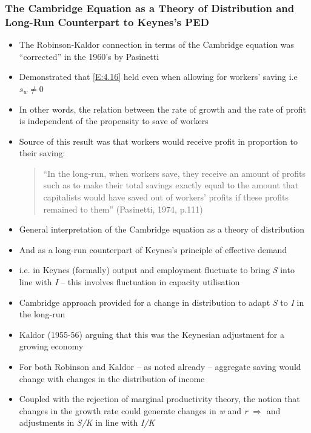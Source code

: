 \documentclass{article}
\begin{document}
\subsubsection{The Cambridge Equation as a Theory of Distribution and Long-Run Counterpart to Keynes's PED}
	\begin{itemize}
		\item The Robinson-Kaldor connection in terms of the Cambridge equation was ``corrected'' in the 1960's by Pasinetti
		\item Demonstrated that \cref{E:4.16} held even when allowing for workers' saving i.e \( s_w \neq 0 \)
		\item In other words, the relation between the rate of growth and the rate of profit is independent of the propensity to save of workers
		\item Source of this result was that workers would receive profit in proportion to their saving:
		\begin{quote}
			``In the long-run, when workers save, they receive an amount of profits such as to make their total savings exactly equal to the amount that capitalists would have saved out of workers' profits if these profits remained to them'' (Pasinetti, 1974, p.111)
		\end{quote}
			\item General interpretation of the Cambridge equation as a theory of distribution
		\item And as a long-run counterpart of Keynes's principle of effective demand
		\item i.e. in Keynes (formally) output and employment fluctuate to bring \textit{S} into line with \textit{I} -- this involves fluctuation in capacity utilisation
		\item Cambridge approach provided for a change in distribution to adapt \textit{S} to \textit{I} in the long-run
		\item Kaldor (1955-56) arguing that this was the Keynesian adjustment for a growing economy 
		\item For both Robinson and Kaldor -- as noted already -- aggregate saving would change with changes in the distribution of income
		\item Coupled with the rejection of marginal productivity theory, the notion that changes in the growth rate could generate changes in \textit{w} and \textit{r} \( \Rightarrow \) and adjustments in \textit{S/K} in line with \textit{I/K}
	\end{itemize}
\end{document}
